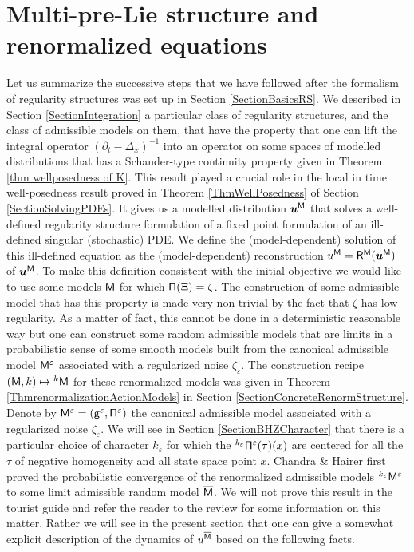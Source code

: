 \documentclass[10pt, reqno]{amsart}
\numberwithin{subsection}{section}
\numberwithin{subsubsection}{subsection}
\numberwithin{equation}{section} %
\theoremstyle{mystyle}
\theoremstyle{mystyle2}
\theoremstyle{mystyle3}
\newcommand{\bsu}{\boldsymbol{u}}
\renewcommand{\epsilon}{\varepsilon}
\begin{document}
\medskip


\section{Multi-pre-Lie structure and renormalized equations}
\label{SectionMultiAndrenormalizedEquations}

Let us summarize the successive steps that we have followed after the formalism of regularity structures was set up in Section \ref{SectionBasicsRS}. We described in Section \ref{SectionIntegration} a particular class of regularity structures, and the class of admissible models on them, that have the property that one can lift the integral operator $(\partial_t-\Delta_x)^{-1}$ into an operator on some spaces of modelled distributions that has a Schauder-type continuity property given in Theorem \ref{thm wellposedness of K}. This result played a crucial role in the local in time well-posedness result proved in Theorem \ref{ThmWellPosedness} of Section \ref{SectionSolvingPDEs}. It gives us a modelled distribution $\bsu^{\sf M}$ that solves a well-defined regularity structure formulation of a fixed point formulation of an ill-defined singular (stochastic) PDE. We define the (model-dependent) solution of this ill-defined equation as the (model-dependent) reconstruction $u^{\sf M}= {\sf R}^{\sf M}(\bsu^{\sf M})$ of $\bsu^{\sf M}$. To make this definition consistent with the initial objective we would like to use some models $\sf M$ for which ${\sf \Pi}(\Xi)=\zeta$. The construction of some admissible model that has this property is made very non-trivial by the fact that $\zeta$ has low regularity. As a matter of fact, this cannot be done in a deterministic reasonable way but one can construct some random admissible models that are limits in a probabilistic sense of some smooth models built from the canonical admissible model ${\sf M}^\epsilon$ associated with a regularized noise $\zeta_\epsilon$. The construction recipe $({\sf M},k)\mapsto {}^k{\sf M}$ for these renormalized models was given in Theorem \ref{ThmrenormalizationActionModels} in Section \ref{SectionConcreteRenormStructure}. Denote by ${\sf M}^\epsilon=({\sf g} ^\epsilon, {\sf \Pi}^\epsilon)$ the canonical admissible model associated with a regularized noise $\zeta_\epsilon$. We will see in Section \ref{SectionBHZCharacter} that there is a particular choice of character $k_\epsilon$ for which the ${}^{k_\epsilon}{\sf \Pi}^\epsilon(\tau)(x)$ are centered for all the $\tau$ of negative homogeneity and all state space point $x$. Chandra \& Hairer first proved the probabilistic convergence of the renormalized admissible models ${}^{k_\epsilon}{\sf M}^\epsilon$ to some limit admissible random model $\overline{\sf M}$. We will not prove this result in the tourist guide and refer the reader to the review \cite{BHReview} for some information on this matter. Rather we will see in the present section that one can give a somewhat explicit description of the dynamics of $u^{\overline{\sf M}}$ based on the following facts.
\end{document}
